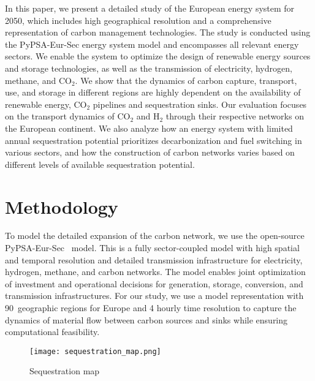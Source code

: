 \documentclass[twocolumn]{article}
\newcommand{\carbon}{CO$_2$}
\newcommand{\hydrogen}{H$_2$}
\begin{document}
In this paper, we present a detailed study of the European energy system for 2050, which includes high geographical resolution and a comprehensive representation of carbon management technologies. The study is conducted using the PyPSA-Eur-Sec energy system model and encompasses all relevant energy sectors. We enable the system to optimize the design of renewable energy sources and storage technologies, as well as the transmission of electricity, hydrogen, methane, and \carbon{}. We show that the dynamics of carbon capture, transport, use, and storage in different regions are highly dependent on the availability of renewable energy, \carbon{} pipelines and sequestration sinks. Our evaluation focuses on the transport dynamics of \carbon{} and \hydrogen{} through their respective networks on the European continent. We also analyze how an energy system with limited annual sequestration potential prioritizes decarbonization and fuel switching in various sectors, and how the construction of carbon networks varies based on different levels of available sequestration potential.


\section{Methodology}
\label{sec:methodology}

To model the detailed expansion of the carbon network, we use the open-source PyPSA-Eur-Sec~\cite{PyPSAEurSecSectorCoupledOpen2023} model. This is a fully sector-coupled model with high spatial and temporal resolution and detailed transmission infrastructure for electricity, hydrogen, methane, and carbon networks. The model enables joint optimization of investment and operational decisions for generation, storage, conversion, and transmission infrastructures. For our study, we use a model representation with 90~geographic regions for Europe and 4 hourly time resolution to capture the dynamics of material flow between carbon sources and sinks while ensuring computational feasibility.


\begin{figure}[h]
    \centering
    \texttt{[image: sequestration\_map.png]}
    \caption{Sequestration map}
    \label{fig:sequestration_map}
\end{figure}
\end{document}
